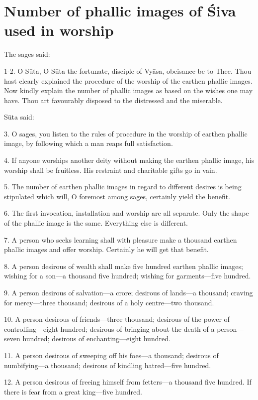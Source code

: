 \chapter{Number of phallic images of Śiva used in worship}

The sages said:

1-2. O Sūta, O Sūta the fortunate, disciple of Vyāsa, obeisance be to Thee. Thou
hast clearly explained the procedure of the worship of the earthen phallic
images. Now kindly explain the number of phallic images as based on the wishes
one may have. Thou art favourably disposed to the distressed and the miserable.

Sūta said:

3. O sages, you listen to the rules of procedure in the worship of earthen
phallic image, by following which a man reaps full satisfaction.

4. If anyone worships another deity without making the earthen phallic image,
his worship shall be fruitless. His restraint and charitable gifts go in vain.

5. The number of earthen phallic images in regard to different desires is being
stipulated which will, O foremost among sages, certainly yield the benefit.

6. The first invocation, installation and worship are all separate. Only
the shape of the phallic image is the same. Everything else is different.

7. A person who seeks learning shall with pleasure make a thousand earthen
phallic images and offer worship. Certainly he will get that benefit.

8. A person desirous of wealth shall make five hundred earthen phallic images;
wishing for a son—a thousand five hundred; wishing for garments—five hundred.

9. A person desirous of salvation—a crore; desirous of lands—a thousand; craving
for mercy—three thousand; desirous of a holy centre—two thousand.

10. A person desirous of friends—three thousand; desirous of the power of
controlling—eight hundred; desirous of bringing about the death of a person—seven
hundred; desirous of enchanting—eight hundred.

11. A person desirous of sweeping off his foes—a thousand; desirous of
numbifying—a thousand; desirous of kindling hatred—five hundred.

12. A person desirous of freeing himself from fetters—a thousand five hundred.
If there is fear from a great king—five hundred.

